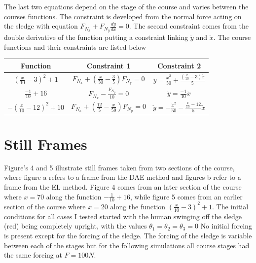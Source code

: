 \documentclass{article}
\begin{document}
The last two equations depend on the stage of the course and varies between the courses functions. The constraint is developed from the normal force acting on the sledge with equation $F_{N_x} + F_{N_y}\frac{dy}{dx}=0$. The second constraint comes from the double derivative of the function putting a constraint linking $\ddot{y}$ and $\ddot{x}$. The course functions and their constraints are listed below
\begin{center}
	\begin{tabular}{c|c|c}
		Function&Constraint 1&Constraint 2\\
		\hline
		$(\frac{x}{10}-3)^2+1$&$F_{N_x}+(\frac{x}{50}-\frac{3}{5})F_{N_y}=0$&$\ddot{y}=\frac{\dot{x}^2}{50} + \frac{\left(\frac{x}{10} - 3\right) \ddot{x}}{5}$\\
		$\frac{-1}{10}+16$&$F_{N_x}-\frac{F_{N_y}}{10}=0$&$\ddot{y}=\frac{-1}{10}\ddot{x}$\\
		$-(\frac{x}{10}-12)^2+10$&$F_{N_x}+(\frac{12}{5}-\frac{x}{50})F_{N_y}=0$&$\ddot{y}=-\frac{\dot{x}^2}{50}-\frac{\frac{x}{10}-12}{5}\ddot{x}$\\
	\end{tabular}
\end{center}

\section{Still Frames}
Figure's 4 and 5 illustrate still frames taken from two sections of the course, where figure a refers to a frame from the DAE method and figures b refer to a frame from the EL method. Figure 4 comes from an later section of the course where $x = 70$ along the function $-\frac{1}{10}+16$, while figure 5 comes from an earlier section of the course where $x=20$ along the function $(\frac{x}{10}-3)^2 + 1$. The initial conditions for all cases I tested started with the human swinging off the sledge (red) being completely upright, with the values $\theta_1 = \theta_2 = \theta_3=0$ No initial forcing is present except for the forcing of the sledge. The forcing of the sledge is variable between each of the stages but for the following simulations all course stages had the same forcing at $F = 100N$.
\end{document}
